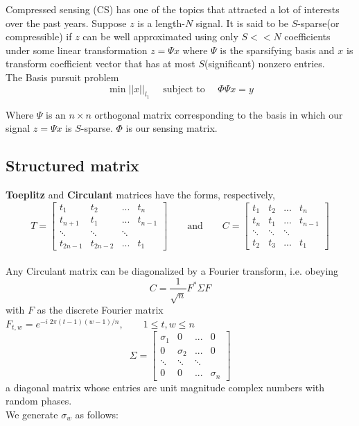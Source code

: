 
Compressed sensing (CS) has one of the topics that attracted a lot of interests over the past years. Suppose $z$ is a length-$N$ signal. It is said to be $S$-sparse(or compressible) if $z$ can be well approximated using only $S << N$ coefficients under some linear transformation
$ z=\Psi x $
where $\Psi$ is the sparsifying basis and $x$ is transform coefficient vector that has at most $S$(significant) nonzero entries.
\\

The Basis pursuit problem 
\begin{equation}
\min ||x||_{l_1} \quad \text{ subject to } \quad \Phi \Psi x=y
\end{equation}


Where $\Psi$ is an $n \times n$ orthogonal matrix corresponding to the basis in which our signal $z = \Psi x$ is $S$-sparse. $\Phi$ is our sensing matrix. 
\\
\subsection*{Structured matrix}
\textbf{Toeplitz} and \textbf{Circulant} matrices have the forms, respectively,
\\

$$
T = \begin{bmatrix}
t_{1}    & t_{2}    & ...    & t_{n}   \\[0.3em]
t_{n+1}  & t_{1}    & ...    & t_{n-1} \\[0.3em]
\ddots   & \ddots   & \ddots &         \\[0.3em]
t_{2n-1} & t_{2n-2} & ...    & t_{1}         
\end{bmatrix}
\qquad \text{and} \qquad
C = \begin{bmatrix}
t_{1}  & t_{2}  & ...    & t_{n}   \\[0.3em]
t_{n}  & t_{1}  & ...    & t_{n-1} \\[0.3em]
\ddots & \ddots & \ddots &         \\[0.3em]
t_{2}  & t_{3}  & ...    & t_{1}        
\end{bmatrix} 
$$
\\
	Any Circulant matrix can be diagonalized by a Fourier transform, i.e. obeying
	$$ C=\frac{1}{\sqrt{n}} F^* \Sigma F $$ with $F$ as the discrete Fourier matrix
	$F_{t,w}=e^{-i\; 2\pi(t-1)(w-1)/n}, \qquad 1 \le t,w \le n$
	$$
	
	
	\Sigma = \begin{bmatrix}
	\sigma_{1} & 0 & ...& 0           \\[0.3em]
	0 & \sigma_{2} & ... & 0 \\[0.3em]
	\ddots &\ddots & \ddots &      \\[0.3em]
	0 & 0 & ... & \sigma_{n}        
	\end{bmatrix} $$
	a diagonal matrix whose entries are unit magnitude complex numbers with random phases.
\\
	We generate $\sigma_{w}$ as follows:
	\\[1em]
	
